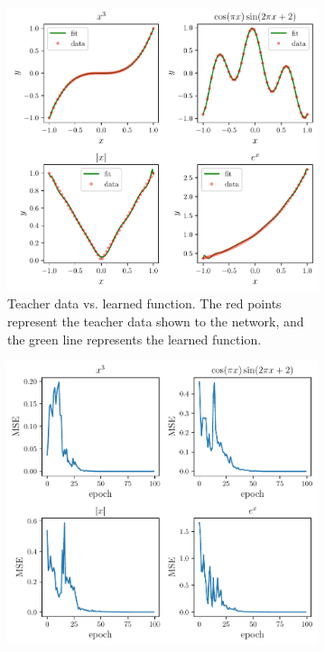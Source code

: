 \documentclass[a4paper,10pt]{article}
\begin{document}
\begin{appendices}
\begin{figure}[ht]
	\centering
	\begin{subfigure}{.4875\textwidth}
		\centering
		\includegraphics[width=1\linewidth]{figures/qnn_regression.pdf}
		\caption{Teacher data vs. learned function. The red points represent the teacher data shown to the network, and the green line represents the learned function.}
	\end{subfigure}
	\hfill
	\begin{subfigure}{.4875\textwidth}
		\centering
		\includegraphics[width=1\linewidth]{figures/qnn_regression_mse.pdf}

\end{subfigure}
\end{figure}
\end{appendices}
\end{document}

